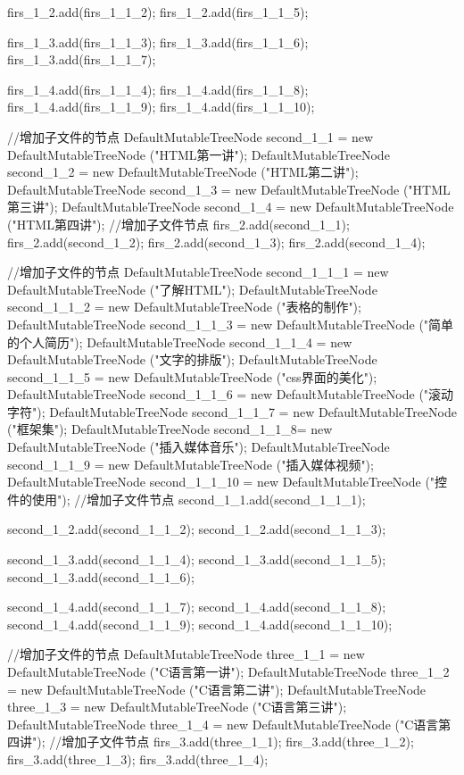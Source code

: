 {{		firs_1_2.add(firs_1_1_2);
		firs_1_2.add(firs_1_1_5);
		
		firs_1_3.add(firs_1_1_3);
		firs_1_3.add(firs_1_1_6);
		firs_1_3.add(firs_1_1_7);
		
		firs_1_4.add(firs_1_1_4);
		firs_1_4.add(firs_1_1_8);
		firs_1_4.add(firs_1_1_9);
		firs_1_4.add(firs_1_1_10);
		
		
		//增加子文件的节点
		DefaultMutableTreeNode  second_1_1 = new DefaultMutableTreeNode ("HTML第一讲");
		DefaultMutableTreeNode  second_1_2 = new DefaultMutableTreeNode ("HTML第二讲");
		DefaultMutableTreeNode  second_1_3 = new DefaultMutableTreeNode ("HTML第三讲");
		DefaultMutableTreeNode  second_1_4 = new DefaultMutableTreeNode ("HTML第四讲");
		//增加子文件节点
		firs_2.add(second_1_1);
		firs_2.add(second_1_2);
		firs_2.add(second_1_3);
		firs_2.add(second_1_4);
		
		//增加子文件的节点
		DefaultMutableTreeNode  second_1_1_1 = new DefaultMutableTreeNode ("了解HTML");
		DefaultMutableTreeNode  second_1_1_2 = new DefaultMutableTreeNode ("表格的制作");
		DefaultMutableTreeNode  second_1_1_3 = new DefaultMutableTreeNode ("简单的个人简历");
		DefaultMutableTreeNode  second_1_1_4 = new DefaultMutableTreeNode ("文字的排版");
		DefaultMutableTreeNode  second_1_1_5 = new DefaultMutableTreeNode ("css界面的美化");
		DefaultMutableTreeNode  second_1_1_6 = new DefaultMutableTreeNode ("滚动字符");
		DefaultMutableTreeNode  second_1_1_7 = new DefaultMutableTreeNode ("框架集");
		DefaultMutableTreeNode  second_1_1_8= new DefaultMutableTreeNode ("插入媒体音乐");
		DefaultMutableTreeNode  second_1_1_9 = new DefaultMutableTreeNode ("插入媒体视频");
		DefaultMutableTreeNode  second_1_1_10 = new DefaultMutableTreeNode ("控件的使用");
		//增加子文件节点
		second_1_1.add(second_1_1_1);
		
		second_1_2.add(second_1_1_2);
		second_1_2.add(second_1_1_3);
		
		second_1_3.add(second_1_1_4);
		second_1_3.add(second_1_1_5);
		second_1_3.add(second_1_1_6);
		
		second_1_4.add(second_1_1_7);
		second_1_4.add(second_1_1_8);
		second_1_4.add(second_1_1_9);
		second_1_4.add(second_1_1_10);
		
		
		
		//增加子文件的节点
		DefaultMutableTreeNode  three_1_1 = new DefaultMutableTreeNode ("C语言第一讲");
		DefaultMutableTreeNode  three_1_2 = new DefaultMutableTreeNode ("C语言第二讲");
		DefaultMutableTreeNode  three_1_3 = new DefaultMutableTreeNode ("C语言第三讲");
		DefaultMutableTreeNode  three_1_4 = new DefaultMutableTreeNode ("C语言第四讲");
		//增加子文件节点
		firs_3.add(three_1_1);
		firs_3.add(three_1_2);
		firs_3.add(three_1_3);
		firs_3.add(three_1_4);
		
}}
